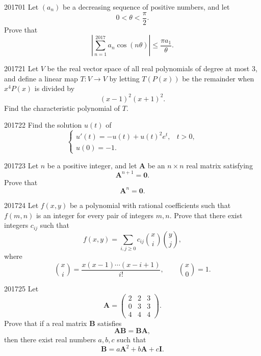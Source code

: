 
\begin{problem}{2017}{0}{1}
Let $(a_n)$ be a decreasing sequence of positive numbers, and let
\[
    0<\theta<\frac{\pi}{2}.
\]
Prove that
\[
    \left|\sum_{n=1}^{2017}a_n\cos(n\theta)\right|
    \le\frac{\pi a_1}{\theta}.
\]
\end{problem}

\begin{problem}{2017}{2}{1}
Let $V$ be the real vector space of all real polynomials of degree at most $3$, and define a linear map $T\colon V\to V$ by letting $T(P(x))$ be the remainder when $x^4P(x)$ is divided by
\[
    (x-1)^2(x+1)^2.
\]
Find the characteristic polynomial of $T$.
\end{problem}

\begin{problem}{2017}{2}{2}
Find the solution $u(t)$ of
\[
\begin{cases}
    u'(t)=-u(t)+u(t)^2e^t, & t>0, \\
    u(0)=-1.
\end{cases}
\]
\end{problem}

\begin{problem}{2017}{2}{3}
Let $n$ be a positive integer, and let $\mathbf A$ be an $n\times n$ real matrix satisfying
\[
    \mathbf A^{n+1}=\mathbf0.
\]
Prove that
\[
    \mathbf A^n=\mathbf0.
\]
\end{problem}

\begin{problem}{2017}{2}{4}
Let $f(x, y)$ be a polynomial with rational coefficients such that $f(m, n)$ is an integer for every pair of integers $m, n$. Prove that there exist integers $c_{ij}$ such that
\[
    f(x, y)=\sum_{i, j\ge0}c_{ij}\binom{x}{i}\binom{y}{j},
\]
where
\[
    \binom{x}{i}
    =\frac{x(x-1)\cdots(x-i+1)}{i!},
    \qquad
    \binom{x}{0}=1.
\]
\end{problem}

\begin{problem}{2017}{2}{5}
Let
\[
    \mathbf A=
    \begin{pmatrix}
        2&2&3\\
        0&3&3\\
        4&4&4
    \end{pmatrix}.
\]
Prove that if a real matrix $\mathbf B$ satisfies
\[
    \mathbf A\mathbf B=\mathbf B\mathbf A,
\]
then there exist real numbers $a, b, c$ such that
\[
    \mathbf B=a\mathbf A^2+b\mathbf A+c\mathbf I.
\]
\end{problem}

